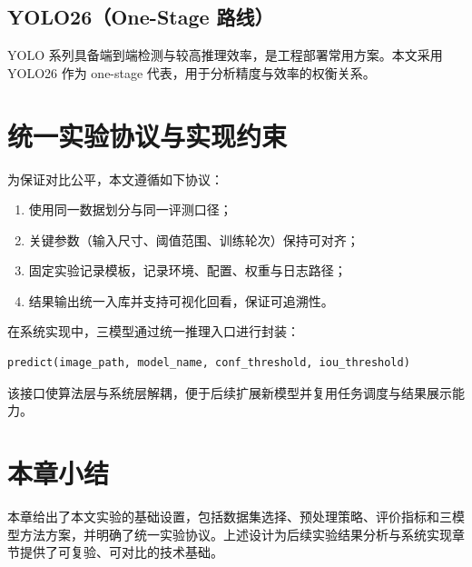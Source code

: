 \subsection{YOLO26（One-Stage 路线）}

YOLO 系列具备端到端检测与较高推理效率，是工程部署常用方案\cite{redmon2016_yolo,redmon2018_yolov3,ultralytics2024_docs}。本文采用 YOLO26 作为 one-stage 代表，用于分析精度与效率的权衡关系。

\section{统一实验协议与实现约束}

为保证对比公平，本文遵循如下协议：

\begin{enumerate}
  \item 使用同一数据划分与同一评测口径；
  \item 关键参数（输入尺寸、阈值范围、训练轮次）保持可对齐；
  \item 固定实验记录模板，记录环境、配置、权重与日志路径；
  \item 结果输出统一入库并支持可视化回看，保证可追溯性。
\end{enumerate}

在系统实现中，三模型通过统一推理入口进行封装：

\begin{verbatim}
predict(image_path, model_name, conf_threshold, iou_threshold)
\end{verbatim}

该接口使算法层与系统层解耦，便于后续扩展新模型并复用任务调度与结果展示能力。

\section{本章小结}

本章给出了本文实验的基础设置，包括数据集选择、预处理策略、评价指标和三模型方法方案，并明确了统一实验协议。上述设计为后续实验结果分析与系统实现章节提供了可复验、可对比的技术基础。
